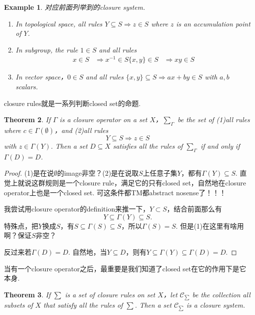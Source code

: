 \documentclass{article}
\newtheorem{theorem}{Theorem}[section]
\newtheorem{example}[theorem]{Example}
\begin{document}
\begin{example}
\rm 对应前面列举到的closure system.
\begin{enumerate}
	\item In topological space, all rules $Y \subseteq S \Rightarrow z \in S$ where $z$ is an accumulation point of $Y$.  
	\item In subgroup, the rule $1 \in S$ and all rules
	$$
		\begin{aligned}
			x \in S &\Rightarrow x^{-1} \in S
			\{x,y\} \in S &\Rightarrow xy \in S
		\end{aligned}
	$$
	\item In vector space，$0 \in S$ and all rules $\{x,y\} \subseteq S \Rightarrow ax + by \in S$ with $a,b$ scalars. 
\end{enumerate}
\end{example}

{\color{blue} closure rules就是一系列判断closed set的命题}.

\begin{theorem}
\rm {\color{red} If $\Gamma$ is a closure operator on a set $X$}，$\sum_{\Gamma}$ be the set of (1)all rules where $c \in \Gamma(\emptyset)$，and (2)all rules
$$
Y \subseteq  S \Rightarrow z \in S
$$
with $z \in \Gamma(Y)$. Then a set $D \subseteq X$ satisfies all the rules of $\sum_\Gamma$ if and only if $\Gamma(D) = D$.
\end{theorem}

\begin{proof}
(1)是在说$\emptyset$的image非空？(2)是在说取$S$上任意子集$Y$，都有$\Gamma(Y) \subseteq S$. 直觉上就说这群规则是一个closure rule，满足它的只有closed set，自然地在closure operator上也是一个closed set. 可这条件都TM都abstract nosense了！！！

我尝试用closure operator的definition来推一下，$Y \subset S$，结合前面那么有
$$
Y \subseteq \Gamma(Y) \subseteq S.
$$
特殊点，把$Y$换成$S$，有$S \subseteq \Gamma(S) \subseteq S$，所以$\Gamma(S) = S$. 但是(1)在这里有啥用啊？保证$S$非空？

反过来若$\Gamma(D) = D$. 自然地，当$Y \subseteq D$，则有$Y \subseteq \Gamma(Y) \subseteq \Gamma(D) =  D$.
\end{proof}

{\color{blue} 当有一个closure operator之后，最重要是我们知道了closed set在它的作用下是它本身}.

\begin{theorem}
\rm {\color{red} If $\sum$ is a set of closure rules on set $X$}，let $\mathcal{C}_{\sum}$ be the collection all subsets of $X$ that satisfy all the rules of $\sum$. Then a set $\mathcal{C}_{\sum}$ is a closure system. 
\end{theorem}
\end{document}
